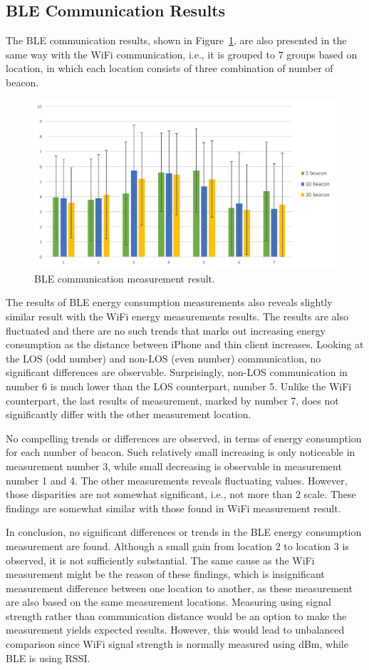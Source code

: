 \documentclass[journal]{vgtc}                %
\begin{document}
\subsection{BLE Communication Results} %
\label{sub:ble_communication_results}
The BLE communication results, shown in Figure~\ref{fig:ble-result}, are also presented in the same way with the WiFi communication, i.e., it is grouped to 7 groups based on location, in which each location consists of three combination of number of beacon.

\begin{figure}
  \centering
    \includegraphics[width=.5\textwidth]{ble}
  \caption{BLE communication measurement result.}
  \label{fig:ble-result}
\end{figure}

The results of BLE energy consumption measurements also reveals slightly similar result with the WiFi energy measurements results. The results are also fluctuated and there are no such trends that marks out increasing energy consumption as the distance between iPhone and thin client increases. Looking at the LOS (odd number) and non-LOS (even number) communication, no significant differences are observable. Surprisingly, non-LOS communication in number 6 is much lower than the LOS counterpart, number 5. Unlike the WiFi counterpart, the last results of measurement, marked by number 7, does not significantly differ with the other measurement location.

No compelling trends or differences are observed, in terms of energy consumption for each number of beacon. Such relatively small increasing is only noticeable in measurement number 3, while small decreasing is observable in measurement number 1 and 4. The other measurements reveals fluctuating values. However, those disparities are not somewhat significant, i.e., not more than 2 scale. These findings are somewhat similar with those found in WiFi measurement result.

In conclusion, no significant differences or trends in the BLE energy consumption measurement are found. Although a small gain from location 2 to location 3 is observed, it is not sufficiently substantial. The same cause as the WiFi measurement might be the reason of these findings, which is insignificant measurement difference between one location to another, as these measurement are also based on the same measurement locations. Measuring using signal strength rather than communication distance would be an option to make the measurement yields expected results. However, this would lead to unbalanced comparison since WiFi signal strength is normally measured using dBm, while BLE is using RSSI.
\end{document}
